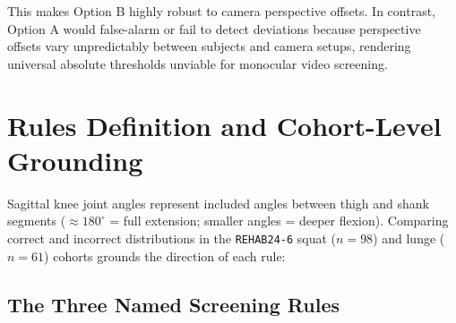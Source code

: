 This makes Option B highly robust to camera perspective offsets. In contrast, Option A would false-alarm or fail to detect deviations because perspective offsets vary unpredictably between subjects and camera setups, rendering universal absolute thresholds unviable for monocular video screening.



\section{Rules Definition and Cohort-Level Grounding}
\label{sec:10-4-rules-definition-and-cohort-level-grounding}


Sagittal knee joint angles represent included angles between thigh and shank segments ($\approx 180^\circ$ = full extension; smaller angles = deeper flexion). Comparing correct and incorrect distributions in the \texttt{REHAB24-6} squat ($n=98$) and lunge ($n=61$) cohorts grounds the direction of each rule:

\subsection{The Three Named Screening Rules}
\label{sec:10-4-1-the-three-named-screening-rules}

